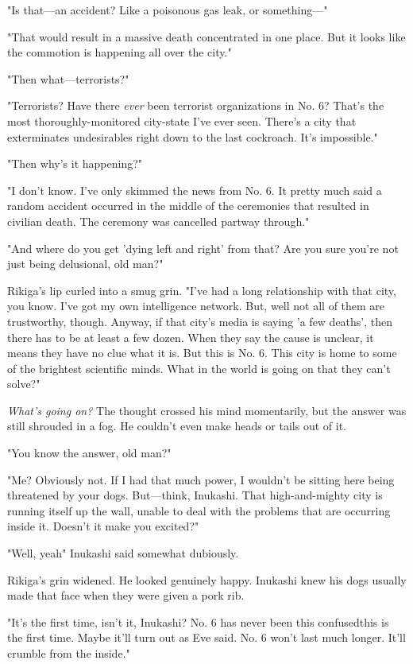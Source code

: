 "Is that---an accident? Like a poisonous gas leak, or something---"

"That would result in a massive death concentrated in one place. But it
looks like the commotion is happening all over the city."

"Then what---terrorists?"

"Terrorists? Have there \emph{ever} been terrorist organizations in No. 6?
That's the most thoroughly-monitored city-state I've ever seen. There's
a city that exterminates undesirables right down to the last cockroach.
It's impossible."

"Then why's it happening?"

"I don't know. I've only skimmed the news from No. 6. It pretty much
said a random accident occurred in the middle of the ceremonies that
resulted in civilian death. The ceremony was cancelled partway through."

"And where do you get 'dying left and right' from that? Are you sure
you're not just being delusional, old man?"

Rikiga's lip curled into a smug grin. "I've had a long relationship with
that city, you know. I've got my own intelligence network. But, well\el 
not all of them are trustworthy, though. Anyway, if that city's media is
saying 'a few deaths', then there has to be at least a few dozen. When
they say the cause is unclear, it means they have no clue what it is.
But this is No. 6. This city is home to some of the brightest scientific
minds. What in the world is going on that they can't solve?"

\emph{What's going on?} The thought crossed his mind momentarily, but the
answer was still shrouded in a fog. He couldn't even make heads or tails
out of it.

"You know the answer, old man?"

"Me? Obviously not. If I had that much power, I wouldn't be sitting here
being threatened by your dogs. But---think, Inukashi. That high-and-mighty
city is running itself up the wall, unable to deal with the problems
that are occurring inside it. Doesn't it make you excited?"

"Well, yeah\el " Inukashi said somewhat dubiously.

Rikiga's grin widened. He looked genuinely happy. Inukashi knew his dogs
usually made that face when they were given a pork rib.

"It's the first time, isn't it, Inukashi? No. 6 has never been this
confused\el this is the first time. Maybe it'll turn out as Eve said.
No. 6 won't last much longer. It'll crumble from the inside."

